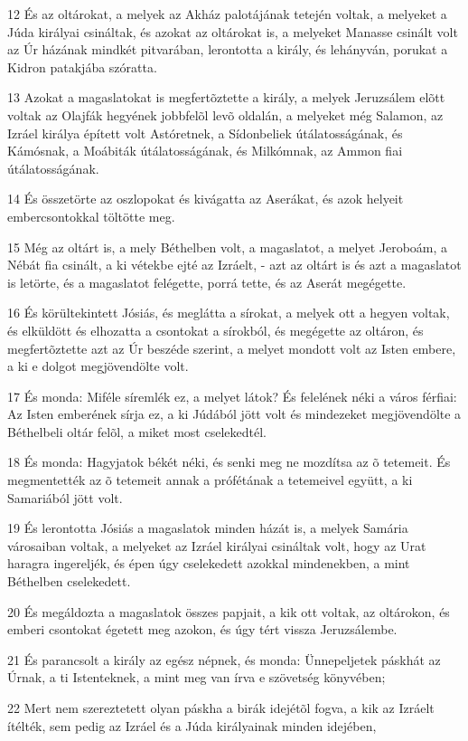 \par 12 És az oltárokat, a melyek az Akház palotájának tetején voltak, a melyeket a Júda királyai csináltak, és azokat az oltárokat is, a melyeket Manasse csinált volt az Úr házának mindkét pitvarában, lerontotta a király, és lehányván, porukat a Kidron patakjába szóratta.
\par 13 Azokat a magaslatokat is megfertõztette a király, a melyek Jeruzsálem elõtt voltak az Olajfák hegyének jobbfelõl levõ oldalán, a melyeket még Salamon, az Izráel királya épített volt Astóretnek, a Sídonbeliek útálatosságának, és Kámósnak, a Moábiták útálatosságának, és Milkómnak, az Ammon fiai útálatosságának.
\par 14 És összetörte az oszlopokat és kivágatta az Aserákat, és azok helyeit embercsontokkal töltötte meg.
\par 15 Még az oltárt is, a mely Béthelben volt, a magaslatot, a melyet Jeroboám, a Nébát fia csinált, a ki vétekbe ejté az Izráelt, - azt az oltárt is és azt a magaslatot is letörte, és a magaslatot felégette, porrá tette, és az Aserát megégette.
\par 16 És körültekintett Jósiás, és meglátta a sírokat, a melyek ott a hegyen voltak, és elküldött és elhozatta a csontokat a sírokból, és megégette az oltáron, és megfertõztette azt az Úr beszéde szerint, a melyet mondott volt az Isten embere, a ki e dolgot megjövendölte volt.
\par 17 És monda: Miféle síremlék ez, a melyet látok? És felelének néki a város férfiai: Az Isten emberének sírja ez, a ki Júdából jött volt és mindezeket megjövendölte a Béthelbeli oltár felõl, a miket most cselekedtél.
\par 18 És monda: Hagyjatok békét néki, és senki meg ne mozdítsa az õ tetemeit. És megmentették az õ tetemeit annak a prófétának a tetemeivel együtt, a ki Samariából jött volt.
\par 19 És lerontotta Jósiás a magaslatok minden házát is, a melyek Samária városaiban voltak, a melyeket az Izráel királyai csináltak volt, hogy az Urat haragra ingereljék, és épen úgy cselekedett azokkal mindenekben, a mint Béthelben cselekedett.
\par 20 És megáldozta a magaslatok összes papjait, a kik ott voltak, az oltárokon, és emberi csontokat égetett  meg azokon, és úgy tért vissza Jeruzsálembe.
\par 21 És parancsolt a király az egész népnek, és monda: Ünnepeljetek páskhát az Úrnak, a ti Istenteknek, a mint meg van írva e szövetség könyvében;
\par 22 Mert nem szereztetett olyan páskha a birák idejétõl fogva, a kik az Izráelt ítélték, sem pedig az Izráel és a Júda királyainak minden idejében,
